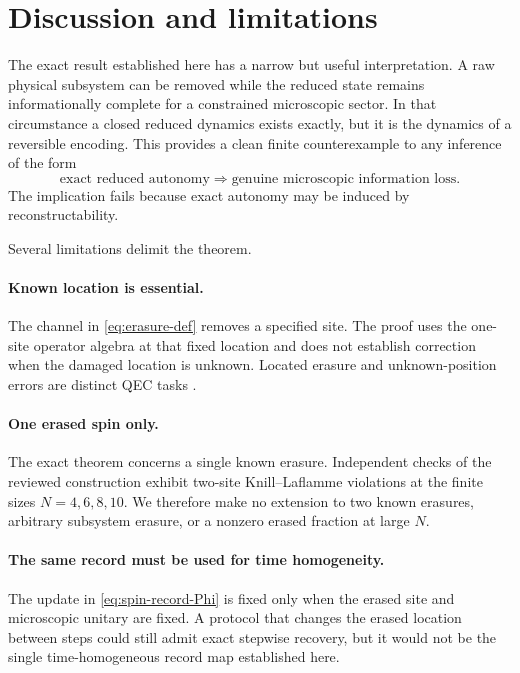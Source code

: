 \section{Discussion and limitations}
\label{sec:discussion}

The exact result established here has a narrow but useful interpretation.  A raw physical subsystem can be removed while the reduced state remains informationally complete for a constrained microscopic sector.  In that circumstance a closed reduced dynamics exists exactly, but it is the dynamics of a reversible encoding.  This provides a clean finite counterexample to any inference of the form
\begin{equation}
  \text{exact reduced autonomy}
  \Longrightarrow
  \text{genuine microscopic information loss}.
\end{equation}
The implication fails because exact autonomy may be induced by reconstructability.

Several limitations delimit the theorem.

\paragraph{Known location is essential.}
The channel in \cref{eq:erasure-def} removes a specified site.  The proof uses the one-site operator algebra at that fixed location and does not establish correction when the damaged location is unknown.  Located erasure and unknown-position errors are distinct QEC tasks \cite{GrasslBethPellizzari1997}.

\paragraph{One erased spin only.}
The exact theorem concerns a single known erasure.  Independent checks of the reviewed construction exhibit two-site Knill--Laflamme violations at the finite sizes $N=4,6,8,10$.  We therefore make no extension to two known erasures, arbitrary subsystem erasure, or a nonzero erased fraction at large $N$.

\paragraph{The same record must be used for time homogeneity.}
The update in \cref{eq:spin-record-Phi} is fixed only when the erased site and microscopic unitary are fixed.  A protocol that changes the erased location between steps could still admit exact stepwise recovery, but it would not be the single time-homogeneous record map established here.

